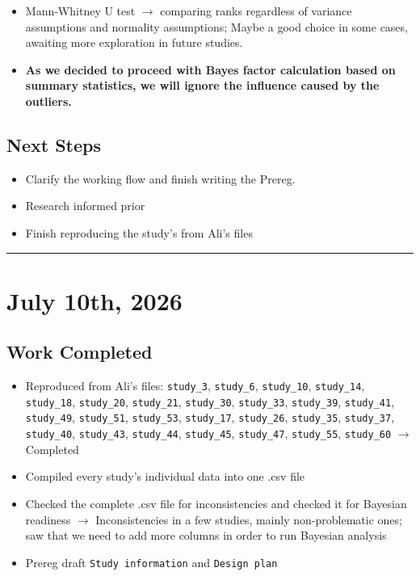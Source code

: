 \documentclass[11pt,a4paper]{article}
\newcommand{\entryseparator}{
  \vspace{1em} \noindent\rule{\textwidth}{0.4pt}
  \vspace*{-\baselineskip} 
}
\begin{document}
\begin{itemize}
    \item Mann-Whitney U test $\rightarrow$ comparing ranks regardless of variance assumptions and normality assumptions; Maybe a good choice in some cases, awaiting more exploration in future studies.
    \item \textbf{As we decided to proceed with Bayes factor calculation based on summary statistics, we will ignore the influence caused by the outliers.}
\end{itemize}

\subsection{Next Steps}

\begin{itemize}
    \item Clarify the working flow and finish writing the Prereg.
    \item Research informed prior
    \item Finish reproducing the study's from Ali's files
\end{itemize}
\entryseparator


\section{July 10th, 2026}

\subsection{Work Completed}

\begin{itemize}
    \item Reproduced from Ali's files:  \texttt{study_3}, \texttt{study_6}, \texttt{study_10}, \texttt{study_14}, \texttt{study_18}, \texttt{study_20}, \texttt{study_21}, \texttt{study_30}, \texttt{study_33}, \texttt{study_39}, \texttt{study_41}, \texttt{study_49}, \texttt{study_51}, \texttt{study_53}, \texttt{study_17}, \texttt{study_26}, \texttt{study_35}, \texttt{study_37}, \texttt{study_40}, \texttt{study_43}, \texttt{study_44}, \texttt{study_45}, \texttt{study_47}, \texttt{study_55}, \texttt{study_60} $\rightarrow $ Completed
    \item Compiled every study's individual data into one .csv file
    \item Checked the complete .csv file for inconsistencies and checked it for Bayesian readiness $\rightarrow$ Inconsistencies in a few studies, mainly non-problematic ones; saw that we need to add more columns in order to run Bayesian analysis
    \item Prereg draft \texttt{Study information} and \texttt{Design plan}
\end{itemize}
\end{document}
